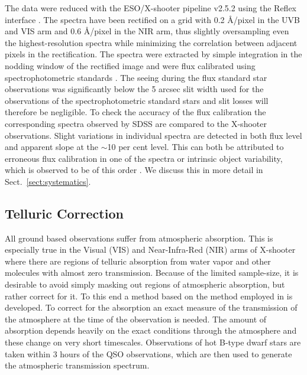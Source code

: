 \documentclass{aa}    %
\newcommand{\sectionname}{Sect.}
\newcommand{\Sect}[1]{\sectionname~\ref{sect:#1}}
\newcommand{\sect}[1]{\Sect{#1}}
\newcommand{\sectlabel}[1]{\label{sect:#1}}
\begin{document}
The data were reduced with the ESO/X-shooter pipeline v2.5.2
\citep{Modigliani2010} using the Reflex interface \citep{Freudling2013}. The
spectra have been rectified on a grid with 0.2 \AA/pixel in the UVB and VIS arm
and 0.6 \AA/pixel in the NIR arm, thus slightly oversampling even the
highest-resolution spectra while minimizing the correlation between adjacent
pixels in the rectification. The spectra were extracted by simple integration in
the nodding window of the rectified image and were flux calibrated using
spectrophotometric standards \citep{Vernet2010, Hamuy1994}. The seeing during the
flux standard star observations was significantly below the 5 arcsec slit width
used for the observations of the spectrophotometric standard stars and slit
losses will therefore be negligible. To check the accuracy of the flux
calibration the corresponding spectra observed by SDSS \citep{Ahn2014} are
compared to the X-shooter observations. Slight variations in individual spectra
are detected in both flux level and apparent slope at the $\sim$10 per cent
level. This can both be attributed to erroneous flux calibration in one of the
spectra or intrinsic object variability, which is observed to be of this order
\citep{MacLeod2012, Morganson2014}. We discuss this in more detail in
\sect{systematics}.





\subsection{Telluric Correction}   \sectlabel{telluric}

All ground based observations suffer from atmospheric absorption. This
is especially true in the Visual (VIS) and Near-Infra-Red (NIR) arms
of X-shooter where there are regions of telluric absorption from water
vapor and other molecules with almost zero transmission. Because of
the limited sample-size, it is desirable to avoid simply masking out
regions of atmospheric absorption, but rather correct for it. To this
end a method based on the method employed in \citet{Chen2014} is
developed.  To correct for the absorption an exact measure of the
transmission of the atmosphere at the time of the observation is
needed. The amount of absorption depends heavily on the exact
conditions through the atmosphere and these change on very short
timescales. Observations of hot B-type dwarf stars are taken within 3
hours of the QSO observations, which are then used to
generate the atmospheric transmission spectrum.
\end{document}

